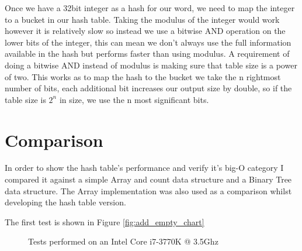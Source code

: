\documentclass[12pt]{article}
\begin{document}
Once we have a 32bit integer as a hash for our word, we need to map the integer to a bucket in our hash table. Taking the modulus of the integer would work however it is relatively slow so instead we use a bitwise AND operation on the lower bits of the integer, this can mean we don't always use the full information available in the hash but performs faster than using modulus. A requirement of doing a bitwise AND instead of modulus is making sure that table size is a power of two. This works as to map the hash to the bucket we take the n rightmost number of bits, each additional bit increases our output size by double, so if the table size is $2^n$ in size, we use the n most significant bits.

\section{Comparison}

In order to show the hash table's performance and verify it's big-O category I compared it against a simple Array and count data structure and a Binary Tree data structure. The Array implementation was also used as a comparison whilst developing the hash table version.

The first test is shown in Figure \ref{fig:add_empty_chart}

\begin{figure}[!htb]
\caption{Tests performed on an Intel Core i7-3770K @ 3.5Ghz}
\label{fig:ad_chart}
\end{figure}
\end{document}
